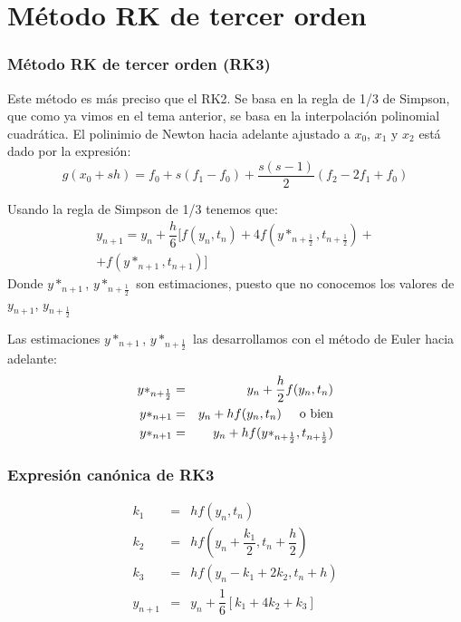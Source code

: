 \section{M\'{e}todo RK de tercer orden}
\begin{frame}
\frametitle{M\'{e}todo RK de tercer orden (RK3)}
Este m\'{e}todo es m\'{a}s preciso que el RK2. Se basa en la regla de 1/3 de Simpson, que como ya vimos en el tema anterior, se basa en la interpolaci\'{o}n polinomial cuadr\'{a}tica. El polinimio de Newton hacia adelante ajustado a $x_{0}$, $x_{1}$ y $x_{2}$ est\'{a} dado por la expresi\'{o}n:
\[ g(x_{0}+sh) = f_{0}+s(f_{1}-f_{0})+ \dfrac{s(s-1)}{2}(f_{2}-2f_{1}+f_{0}) \]
\end{frame}
\begin{frame}
Usando la regla de Simpson de 1/3 tenemos que:
\begin{equation*}
\begin{split}
	y_{n+1} = y_{n} +\dfrac{h}{6} [ f(y_{n},t_{n})+4f(y*_{n+\frac{1}{2}}, t_{n+\frac{1}{2}})+ \\
 +f(y*_{n+1},t_{n+1}) ]
\end{split}
\end{equation*}
Donde $y*_{n+1}$, $y*_{n+\frac{1}{2}}$ son estimaciones, puesto que no conocemos los valores de $y_{n+1}$, $y_{n+\frac{1}{2}}$
\end{frame}
\begin{frame}
Las estimaciones $y*_{n+1}$, $y*_{n+\frac{1}{2}}$ las desarrollamos con el m\'{e}todo de Euler hacia adelante:
\begin{eqnarray*}
	y*_{n+\frac{1}{2}} & = & y_{n} + \dfrac{h}{2} f(y_{n},t_{n}) \\
	y*_{n+1} & = & y_{n} + hf(y_{n},t_{n}) \hspace{0.5cm} \text{o bien}\\
	y*_{n+1} & = & y_{n} +h f(y*_{n+\frac{1}{2}},t_{n+\frac{1}{2}})
\end{eqnarray*}
\end{frame}
\begin{frame}
\frametitle{Expresi\'{o}n can\'{o}nica de RK3}
\begin{eqnarray*}
	k_{1} &=& hf(y_{n},t_{n}) \\
	k_{2} &=& hf(y_{n}+\dfrac{k_{1}}{2}, t_{n}+\dfrac{h}{2}) \\
	k_{3} &=& hf(y_{n}-k_{1}+2k_{2},t_{n}+h) \\
	y_{n+1} &=& y_{n}+\dfrac{1}{6}\left[k_{1}+4k_{2}+k_{3} \right] 
\end{eqnarray*}
\end{frame}
